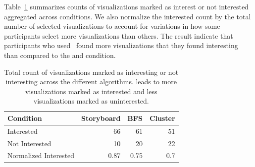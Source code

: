 Table~\ref{table:interestingScore} summarizes counts of visualizations marked as interest or not interested aggregated across conditions. We also normalize the interested count by the total number of selected visualizations to account for variations in how some participants select more visualizations than others. The result indicate that participants who used \system\ found more visualizations that they found interesting than compared to the \BFS  and \cluster condition.
\begin{table}[ht!]
	\centering
	\begin{tabular}{lrrr}
	\hline
	 Condition             &   Storyboard &   BFS &   Cluster \\
	\hline
	 Interested            &  \cellcolor{blue!25}       66    & 61    &      51   \\
	 Not Interested        &  \cellcolor{blue!25}       10    & 20    &      22   \\
	 Normalized Interested &   \cellcolor{blue!25}       0.87 &  0.75 &       0.7 \\
	\hline
	\end{tabular}
	\caption{Total count of visualizations marked as interesting or not interesting across the different algorithms. \system leads to more visualizations marked as interested and less visualizations marked as uninterested.}
	\label{table:interestingScore}
	\vspace{-20pt}
\end{table}
